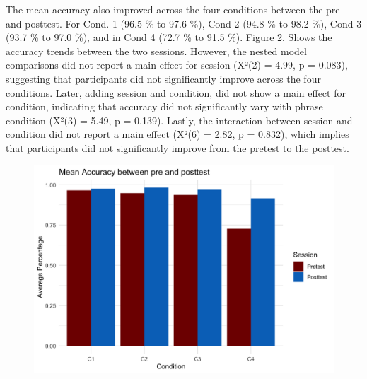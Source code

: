 \documentclass[
  man,floatsintext]{apa6}
\begin{document}
The mean accuracy also improved across the four conditions between the pre- and posttest. For Cond. 1 (96.5 \% to 97.6 \%), Cond 2 (94.8 \% to 98.2 \%), Cond 3 (93.7 \% to 97.0 \%), and in Cond 4 (72.7 \% to 91.5 \%). Figure 2. Shows the accuracy trends between the two sessions. However, the nested model comparisons did not report a main effect for session (X²(2) = 4.99, p = 0.083), suggesting that participants did not significantly improve across the four conditions. Later, adding session and condition, did not show a main effect for condition, indicating that accuracy did not significantly vary with phrase condition (X²(3) = 5.49, p = 0.139). Lastly, the interaction between session and condition did not report a main effect (X²(6) = 2.82, p = 0.832), which implies that participants did not significantly improve from the pretest to the posttest.

\begin{figure}
\includegraphics[width=4.72in]{../Plots/Accuracy} \caption{ }\label{fig:unnamed-chunk-2}
\end{figure}
\end{document}
